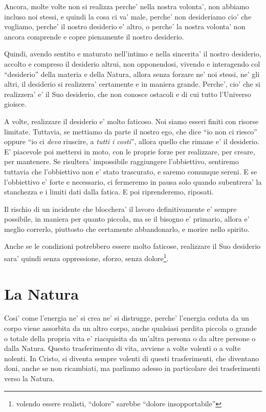 Ancora, molte volte non si realizza perche' nella nostra volonta', non abbiamo incluso noi stessi, e quindi la cosa ci va' male, perche' non desideriamo cio' che vogliamo, perche' il nostro desiderio e' altro, o perche' la nostra volonta' non ancora comprende e copre pienamente il nostro desiderio.

Quindi, avendo sentito e maturato nell'intimo e nella sincerita' il nostro desiderio, accolto e compreso il desiderio altrui, non opponendosi, vivendo e interagendo col ``desiderio'' della materia e della Natura, allora senza forzare ne' noi stessi, ne' gli altri, il desiderio si realizzera' certamente e in maniera grande. Perche', cio' che si realizzera' e' il Suo desiderio, che non conosce ostacoli e di cui tutto l'Universo gioisce. 

A volte, realizzare il desiderio e' molto faticoso. Noi siamo esseri finiti con risorse limitate. Tuttavia, se mettiamo da parte il nostro ego, che dice ``io non ci riesco'' oppure ``io ci \emph{devo} riuscire, a \emph{tutti i costi}'', allora quello che rimane e' il desiderio. E' piacevole poi mettersi in moto, con le proprie forze per realizzare, per creare, per mantenere. Se risultera' impossibile raggiungere l'obbiettivo, sentiremo tuttavia che l'obbiettivo non e' stato trascurato, e saremo comunque sereni. E se l'obbiettivo e' forte e necessario, ci fermeremo in pausa solo quando subentrera' la stanchezza e i limiti dati dalla fatica. E poi riprenderemo, riposati.

Il rischio di un incidente che blocchera' il lavoro definitivamente e' sempre possibile, in maniera per quanto piccola, ma se il bisogno e' primario, allora e' meglio correrlo, piuttosto che certamente abbandonarlo, e morire nello spirito.

Anche se le condizioni potrebbero essere molto faticose, realizzare il Suo desiderio sara' quindi senza oppressione, sforzo, senza dolore\footnote{volendo essere realisti, ``dolore'' sarebbe ``dolore insopportabile''}.


\section{La Natura}

Cosi' come l'energia ne' si crea ne' si distrugge, perche' l'energia ceduta da un corpo viene assorbita da un altro corpo, anche qualsiasi perdita piccola o grande o totale della propria vita e' riacquisita da un'altra persona o da altre persone o dalla Natura. Questo trasferimento di vita, avviene a volte volenti o a volte nolenti. In Cristo, si diventa sempre volenti di questi trasferimenti, che diventano doni, anche se non ricambiati, ma parliamo adesso in particolare dei trasferimenti verso la Natura. 

